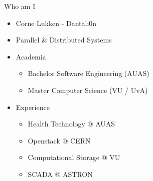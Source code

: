 \documentclass[aspectratio=169]{beamer}
\begin{document}
\begin{frame}{Who am I}
    \begin{itemize}
        \item Corne Lukken - Dantali0n
        \item Parallel \& Distributed Systems
        \item Academia
        \begin{itemize}
            \item \footnotesize Bachelor Software Engineering (AUAS)
            \item \footnotesize Master Computer Science (VU / UvA)
        \end{itemize}
        \item Experience
        \begin{itemize}
            \item \footnotesize Health Technology @ AUAS
            \item \footnotesize Openstack @ CERN
            \item \footnotesize Computational Storage @ VU
            \item \footnotesize SCADA @ ASTRON
        \end{itemize}
    \end{itemize}
\end{frame}
\end{document}
